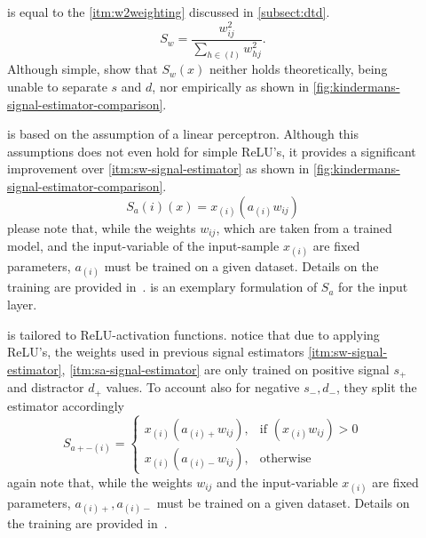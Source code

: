 \begin{description}
    \item[] is equal to the \ref{itm:w2weighting} discussed in \cref{subsect:dtd}.
    \begin{equation}
        S_w = \frac{w_{ij}^2}{\sum_{h\in (l)} w_{hj}^2}.
    \end{equation}
    Although simple,  show that \(S_w(x)\) neither holds theoretically, being unable to separate \(s\) and \(d\), nor empirically as shown in \cref{fig:kindermans-signal-estimator-comparison}.
    \item[] is based on the assumption of a linear perceptron. Although this assumptions does not even hold for simple ReLU's, it provides a significant improvement over \ref{itm:sw-signal-estimator} as shown in \cref{fig:kindermans-signal-estimator-comparison}.
    \begin{equation}
        S_a(i)(x) = x_{(i)} (a_{(i)} w_{ij})\label{eq:linear-estimator}
    \end{equation}
    please note that, while the weights \(w_{ij}\), which are taken from a trained model, and the input-variable of the input-sample \(x_{(i)}\) are fixed parameters, \(a_{(i)}\) must be trained on a given dataset. Details on the training are provided in~\cite{Kindermans.2018}.  is an exemplary formulation of \(S_a\) for the input layer.
    \item[] is tailored to ReLU-activation functions.  notice that due to applying ReLU's, the weights used in previous signal estimators \ref{itm:sw-signal-estimator}, \ref{itm:sa-signal-estimator} are only trained on positive signal \(s_{+}\) and distractor \(d_{+}\) values. To account also for negative \(s_{-}, d_{-}\), they split the estimator accordingly
    \begin{equation}
        S_{a+-(i)} = 
        \begin{cases}
            x_{(i)} (a_{(i)+} w_{ij}),& {\scriptstyle \text{if } (x_{(i)} w_{ij}) > 0}\\
            x_{(i)} (a_{(i)-} w_{ij}),& {\scriptstyle \text{otherwise}}
        \end{cases}
    \end{equation}
    again note that, while the weights \(w_{ij}\) and the input-variable \(x_{(i)}\) are fixed parameters, \(a_{(i)+}, a_{(i)-}\) must be trained on a given dataset. Details on the training are provided in~\cite{Kindermans.2018}.
\end{description}\label{desc:signal-estimators}
